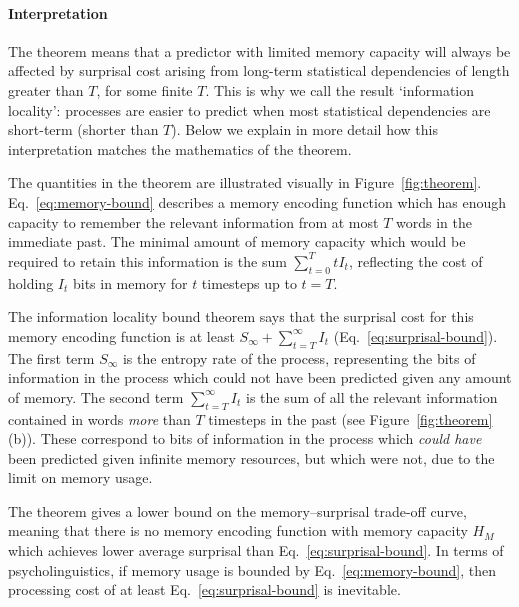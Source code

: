 \paragraph{Interpretation} The theorem means that a predictor with limited memory capacity will always be affected by surprisal cost arising from long-term statistical dependencies of length greater than $T$, for some finite $T$. This is why we call the result `information locality': processes are easier to predict when most statistical dependencies are short-term (shorter than $T$). Below we explain in more detail how this interpretation matches the mathematics of the theorem.

The quantities in the theorem are illustrated visually in Figure~\ref{fig:theorem}. Eq.~\ref{eq:memory-bound} describes a memory encoding function which has enough capacity to remember the relevant information from at most $T$ words in the immediate past. The minimal amount of memory capacity which would be required to retain this information is the sum $\sum_{t=0}^T t I_t$, reflecting the cost of holding $I_t$ bits in memory for $t$ timesteps up to $t=T$. 

The information locality bound theorem says that the surprisal cost for this memory encoding function is at least $S_\infty + \sum_{t=T}^\infty I_t$ (Eq.~\ref{eq:surprisal-bound}). The first term $S_\infty$ is the entropy rate of the process, representing the bits of information in the process which could not have been predicted given any amount of memory. The second term $\sum_{t=T}^\infty I_t$ is the sum of all the relevant information contained in words \emph{more} than $T$ timesteps in the past (see Figure~\ref{fig:theorem}(b)). These correspond to bits of information in the process which \emph{could have} been predicted given infinite memory resources, but which were not, due to the limit on memory usage.

The theorem gives a lower bound on the memory--surprisal trade-off curve, meaning that there is no memory encoding function with memory capacity $H_M$ which achieves lower average surprisal than Eq.~\ref{eq:surprisal-bound}. In terms of psycholinguistics, if memory usage is bounded by Eq.~\ref{eq:memory-bound}, then processing cost of at least Eq.~\ref{eq:surprisal-bound} is inevitable.

